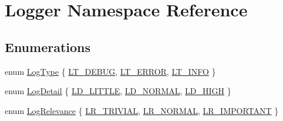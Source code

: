\hypertarget{namespace_logger}{}\section{Logger Namespace Reference}
\label{namespace_logger}
\subsection*{Enumerations}
\begin{DoxyCompactItemize}
\item 
enum \hyperlink{namespace_logger_a8f625bd9ec5f706cb67b725a98743c04}{Log\+Type} \{ \hyperlink{namespace_logger_a8f625bd9ec5f706cb67b725a98743c04ab46e195aa1062a5d9f4366486ea131f3}{L\+T\+\_\+\+D\+E\+B\+UG}, 
\hyperlink{namespace_logger_a8f625bd9ec5f706cb67b725a98743c04a7558ebf8aecb9a3b538e639e11237f33}{L\+T\+\_\+\+E\+R\+R\+OR}, 
\hyperlink{namespace_logger_a8f625bd9ec5f706cb67b725a98743c04ae2f929c9ea7ffc45e696e247034a1616}{L\+T\+\_\+\+I\+N\+FO}
 \}
\item 
enum \hyperlink{namespace_logger_a5838bb966bb2e56b838cbf5ce207d014}{Log\+Detail} \{ \hyperlink{namespace_logger_a5838bb966bb2e56b838cbf5ce207d014a13b85f16e10f02f0f7831f7f1e62172e}{L\+D\+\_\+\+L\+I\+T\+T\+LE}, 
\hyperlink{namespace_logger_a5838bb966bb2e56b838cbf5ce207d014acdb9720161dbe34ef066448bc3362452}{L\+D\+\_\+\+N\+O\+R\+M\+AL}, 
\hyperlink{namespace_logger_a5838bb966bb2e56b838cbf5ce207d014a81011f9c7cb8f58acfae6d88b064466b}{L\+D\+\_\+\+H\+I\+GH}
 \}
\item 
enum \hyperlink{namespace_logger_ac0ba8933d14b2c05d8a87ef9319924fa}{Log\+Relevance} \{ \hyperlink{namespace_logger_ac0ba8933d14b2c05d8a87ef9319924faaae660d03b3378eb8cf44d6acc5f03734}{L\+R\+\_\+\+T\+R\+I\+V\+I\+AL}, 
\hyperlink{namespace_logger_ac0ba8933d14b2c05d8a87ef9319924faa4427eed1049860091a1cd794be6817cf}{L\+R\+\_\+\+N\+O\+R\+M\+AL}, 
\hyperlink{namespace_logger_ac0ba8933d14b2c05d8a87ef9319924faa34fddfe05472d43cf2f67c5ecae54d57}{L\+R\+\_\+\+I\+M\+P\+O\+R\+T\+A\+NT}
 \}
\end{DoxyCompactItemize}
